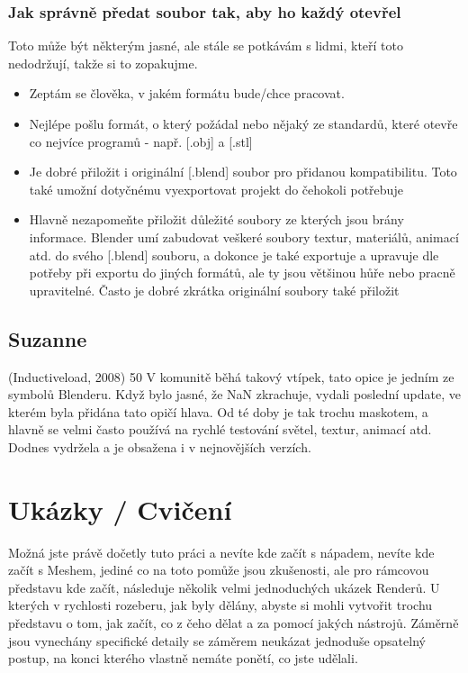 \documentclass[12pt,a4paper]{report}
\begin{document}
	\subsection{Jak správně předat soubor tak, aby ho každý otevřel}
	Toto může být některým jasné, ale stále se potkávám s lidmi, kteří toto
	nedodržují, takže si to zopakujme.
	\begin{itemize}
		\item Zeptám se člověka, v jakém formátu bude/chce pracovat.
		\item Nejlépe pošlu formát, o který požádal nebo nějaký ze standardů,
	které otevře co nejvíce programů - např. [.obj] a [.stl]
		\item Je dobré přiložit i originální [.blend] soubor pro přidanou
	kompatibilitu. Toto také umožní dotyčnému vyexportovat projekt do
	čehokoli potřebuje
		\item Hlavně nezapomeňte přiložit důležité soubory ze kterých jsou brány
	informace. Blender umí zabudovat veškeré soubory textur,
	materiálů, animací atd. do svého [.blend] souboru, a dokonce je
	také exportuje a upravuje dle potřeby při exportu do jiných
	formátů, ale ty jsou většinou hůře nebo pracně upravitelné. Často je
	dobré zkrátka originální soubory také přiložit
	\end{itemize}

	\section{Suzanne}
	(Inductiveload, 2008)
	50
	V komunitě běhá takový vtípek, tato opice je jedním ze symbolů
	Blenderu. Když bylo jasné, že NaN zkrachuje, vydali poslední update, ve
	kterém byla přidána tato opičí hlava. Od té doby je tak trochu maskotem,
	a hlavně se velmi často používá na rychlé testování světel, textur,
	animací atd. Dodnes vydržela a je obsažena i v nejnovějších verzích.
	
	
	\chapter{Ukázky / Cvičení}
	Možná jste právě dočetly tuto práci a nevíte kde začít s nápadem, nevíte
	kde začít s Meshem, jediné co na toto pomůže jsou zkušenosti, ale pro
	rámcovou představu kde začít, následuje několik velmi jednoduchých
	ukázek Renderů. U kterých v rychlosti rozeberu, jak byly dělány, abyste si
	mohli vytvořit trochu představu o tom, jak začít, co z čeho dělat a za
	pomocí jakých nástrojů. Záměrně jsou vynechány specifické detaily se
	záměrem neukázat jednoduše opsatelný postup, na konci kterého vlastně
	nemáte ponětí, co jste udělali.
\end{document}
